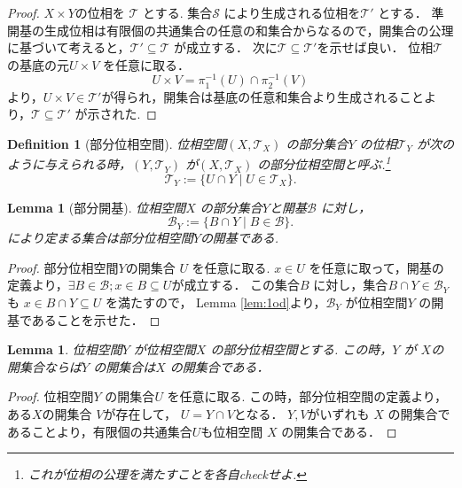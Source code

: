 \documentclass[dvipdfmx]{jbook}
\newtheorem{lemma}[theorem]{Lemma}
\newtheorem{definition}{Definition}[section]
\theoremstyle{remark}
\theoremstyle{plain}
\begin{document}
\begin{proof}
	$X\times Y$の位相を $\mathcal{T}$ とする.
	集合$\mathcal{S}$ により生成される位相を$\mathcal{T}'$ とする．
	準開基の生成位相は有限個の共通集合の任意の和集合からなるので，開集合の公理に基づいて考えると，$\mathcal{T}' \subseteq \mathcal{T}$ が成立する．
	次に$\mathcal{T} \subseteq \mathcal{T}'$を示せば良い．
	位相$\mathcal{T}$ の基底の元$U\times V $ を任意に取る．
	$$
	U \times V = \pi_1^{-1}\left( U \right) \cap \pi_2^{-1}\left( V \right)  
	$$
	より，$U \times V \in \mathcal{T}'$が得られ，開集合は基底の任意和集合より生成されることより，$\mathcal{T} \subseteq \mathcal{T}'$ が示された.
\end{proof}

\begin{definition}[部分位相空間]
	位相空間$\left( X,\mathcal{T}_X \right) $ の部分集合$Y$ の位相$\mathcal{T}_Y$ が次のように与えられる時，$(Y,\mathcal{T}_Y)$ が$\left( X, \mathcal{T}_X \right) $ の部分位相空間と呼ぶ.\footnote{これが位相の公理を満たすことを各自checkせよ.}
	\[
	\mathcal{T}_Y := \{U \cap Y  \mid U \in \mathcal{T}_X\}
	.\] 

\end{definition}

\begin{lemma}[部分開基]
	位相空間$X$ の部分集合$Y$と開基$\mathcal{B}$ に対し，
	\[
	\mathcal{B}_Y := \{B\cap Y \mid B \in \mathcal{B}\} 
	.\]
	により定まる集合は部分位相空間$Y$の開基である.
\end{lemma}

\begin{proof}
	部分位相空間$Y$の開集合 $U$ を任意に取る.
	$x \in U$ を任意に取って，開基の定義より，$\exists B \in \mathcal{B}; x \in B \subseteq U$が成立する．
	この集合$B$ に対し，集合$B \cap Y \in \mathcal{B}_Y$も $x \in B \cap Y  \subseteq U$ を満たすので， Lemma \ref{lem:1od}より，$\mathcal{B}_Y$ が位相空間$Y$ の開基であることを示せた．
\end{proof}

\begin{lemma}
\label{lem:openset}
	位相空間$Y$ が位相空間$X$ の部分位相空間とする.
	この時，$Y$ が $X$の開集合ならば$Y$ の開集合は$X$ の開集合である．
\end{lemma}

\begin{proof}
	位相空間$Y$ の開集合$U$ を任意に取る.
	この時，部分位相空間の定義より，ある$X$の開集合 $V$が存在して， $U=Y\cap V$となる．
	$Y,V$がいずれも $X$ の開集合であることより，有限個の共通集合$U$も位相空間 $X$ の開集合である．
\end{proof}
\end{document}
